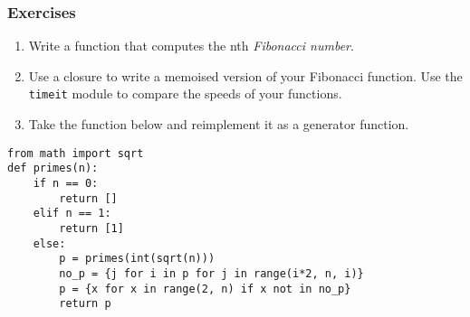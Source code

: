 \documentclass[10pt]{beamer}
\begin{document}
\begin{frame}[fragile]
	\frametitle{Exercises}
	\begin{enumerate}
		\item Write a function that computes the nth \emph{Fibonacci number}.
		\item Use a closure to write a memoised version of your Fibonacci function.
			Use the \texttt{timeit} module to compare the speeds of your functions.
		\item Take the function below and reimplement it as a generator function.
	\end{enumerate}
\begin{Verbatim}[commandchars=\\\%\%]
from math import sqrt
def primes(n):
    if n == 0:
        return []
    elif n == 1:
        return [1]
    else:
        p = primes(int(sqrt(n)))
        no_p = {j for i in p for j in range(i*2, n, i)}
        p = {x for x in range(2, n) if x not in no_p}
        return p
\end{Verbatim}
\end{frame}
\end{document}
